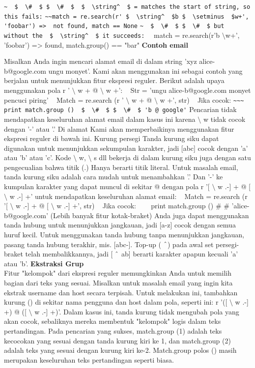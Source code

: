 \begin {enumerate}
\begin {enumerate}
\verb|~  $  \#  $ $  \#  $  $  \string^  $ = matches the start of string, so this fails:|
\verb|~~match = re.search(r' $  \string^  $b $  \setminus  $w+', 'foobar') =>  not found, match == None|
\verb|~  $  \#  $ $  \#  $ but without the  $  \string^  $ it succeeds:|
~~match = re.search(r'b $  \setminus  $w+', 'foobar') =>  found, match.group() == "bar"
{\fontsize{14pt}{14pt}\selectfont \textbf{Contoh email} \\} \par
Misalkan Anda ingin mencari alamat email di dalam string 'xyz alice-b@google.com ungu monyet'. Kami akan menggunakan ini sebagai contoh yang berjalan untuk menunjukkan fitur ekspresi reguler. Berikut adalah upaya menggunakan pola r ' $  \setminus  $ w + @  $  \setminus  $ w +':
~ Str = 'ungu alice-b@google.com monyet pencuci piring'
~ Match = re.search (r ' $  \setminus  $ w + @  $  \setminus  $ w +', str)
~ Jika cocok:
\verb|~~~ print match.group ()  $  \#  $ $  \#  $ 'b @ google'|
Pencarian tidak mendapatkan keseluruhan alamat email dalam kasus ini karena  $  \setminus  $ w tidak cocok dengan '-' atau '.' Di alamat Kami akan memperbaikinya menggunakan fitur ekspresi reguler di bawah ini. Kurung persegi Tanda kurung siku dapat digunakan untuk menunjukkan sekumpulan karakter, jadi [abc] cocok dengan 'a' atau 'b' atau 'c'. Kode  $  \setminus  $ w,  $  \setminus  $ s dll bekerja di dalam kurung siku juga dengan satu pengecualian bahwa titik (.) Hanya berarti titik literal. Untuk masalah email, tanda kurung siku adalah cara mudah untuk menambahkan '.' Dan '-' ke kumpulan karakter yang dapat muncul di sekitar @ dengan pola r '[ $  \setminus  $ w .-] + @ [ $  \setminus  $ w .-] +' untuk mendapatkan keseluruhan alamat email:
~ Match = re.search (r '[ $  \setminus  $ w .-] + @ [ $  \setminus  $ w .-] +', str)
~ Jika cocok:
~~~ print match.group ()  $  \#  $ $  \#  $ 'alice-b@google.com'
(Lebih banyak fitur kotak-braket) Anda juga dapat menggunakan tanda hubung untuk menunjukkan jangkauan, jadi [a-z] cocok dengan semua huruf kecil. Untuk menggunakan tanda hubung tanpa menunjukkan jangkauan, pasang tanda hubung terakhir, mis. [abc-]. Top-up ( $  \string^  $) pada awal set persegi-braket telah membalikkannya, jadi [ $  \string^  $ ab] berarti karakter apapun kecuali 'a' atau 'b'.
{\fontsize{14pt}{14pt}\selectfont \textbf{Ekstraksi Grup} \\}
Fitur "kelompok" dari ekspresi reguler memungkinkan Anda untuk memilih bagian dari teks yang sesuai. Misalkan untuk masalah email yang ingin kita ekstrak username dan host secara terpisah. Untuk melakukan ini, tambahkan kurung () di sekitar nama pengguna dan host dalam pola, seperti ini: r '([ $  \setminus  $ w .-] +) @ ([ $  \setminus  $ w .-] +)'. Dalam kasus ini, tanda kurung tidak mengubah pola yang akan cocok, sebaliknya mereka membentuk "kelompok" logis dalam teks pertandingan. Pada pencarian yang sukses, match.group (1) adalah teks kecocokan yang sesuai dengan tanda kurung kiri ke 1, dan match.group (2) adalah teks yang sesuai dengan kurung kiri ke-2. Match.group polos () masih merupakan keseluruhan teks pertandingan seperti biasa.

\end{enumerate}
\end{enumerate}
